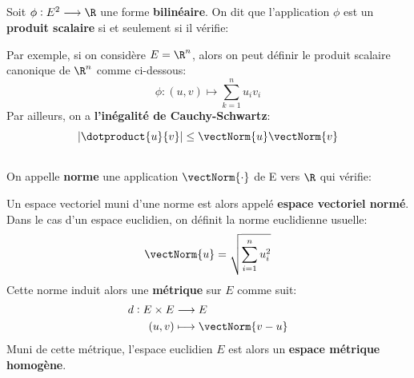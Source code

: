\subsection*{}
Soit \(\phi : E^2 \longrightarrow \R\) une forme \textbf{bilinéaire}. On dit que l'application \(\phi\) est un \textbf{produit scalaire} si et seulement si il vérifie:



Par exemple, si on considère \(E = \R^n\), alors on peut définir le produit scalaire canonique de \(\R^n\) comme ci-dessous:
\[
   \phi : (u, v) \longmapsto \sum_{k=1}^{n} u_iv_i 
\]
Par ailleurs, on a \textbf{l'inégalité de Cauchy-Schwartz}:
\[
    |\dotproduct{u}{v}| \leq \vectNorm{u} \vectNorm{v}
\]

\subsection*{}
On appelle \textbf{norme} une application \(\vectNorm{\cdot}\) de E vers \(\R\) qui vérifie:

Un espace vectoriel muni d'une norme est alors appelé \textbf{espace vectoriel normé}. Dans le cas d'un espace euclidien, on définit la norme euclidienne usuelle:
\[
   \vectNorm{u} = \sqrt{\sum_{i=1}^n u_i^2}
\]
Cette norme induit alors une \textbf{métrique} sur \(E\)  comme suit:
\[
   \begin{aligned}
      d: E \times E &\longrightarrow E\\
      (u, v) &\longmapsto \vectNorm{v - u}
   \end{aligned}
\]
Muni de cette métrique, l'espace euclidien \(E\) est alors un \textbf{espace métrique homogène}.


